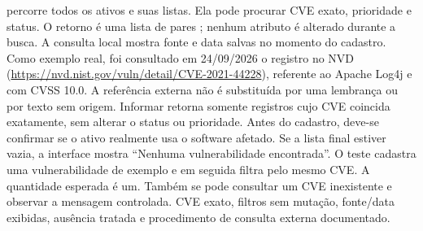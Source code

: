 
  percorre todos os ativos e suas listas. Ela pode procurar CVE exato, prioridade e status. O retorno é uma lista de pares ; nenhum atributo é alterado durante a busca.
 A consulta local mostra fonte e data salvas no momento do cadastro. Como exemplo real, foi consultado em 24/09/2026 o registro  no NVD (\url{https://nvd.nist.gov/vuln/detail/CVE-2021-44228}), referente ao Apache Log4j e com CVSS 10.0. A referência externa não é substituída por uma lembrança ou por texto sem origem.
 Informar  retorna somente registros cujo CVE coincida exatamente, sem alterar o status ou prioridade. Antes do cadastro, deve-se confirmar se o ativo realmente usa o software afetado. Se a lista final estiver vazia, a interface mostra ``Nenhuma vulnerabilidade encontrada''.
 O teste cadastra uma vulnerabilidade de exemplo e em seguida filtra pelo mesmo CVE. A quantidade esperada é um. Também se pode consultar um CVE inexistente e observar a mensagem controlada.
 CVE exato, filtros sem mutação, fonte/data exibidas, ausência tratada e procedimento de consulta externa documentado.

